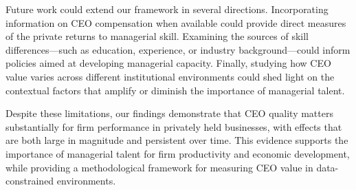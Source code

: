 \documentclass[11pt,a4paper]{article}
\begin{document}
Future work could extend our framework in several directions. Incorporating information on CEO compensation when available could provide direct measures of the private returns to managerial skill. Examining the sources of skill differences—such as education, experience, or industry background—could inform policies aimed at developing managerial capacity. Finally, studying how CEO value varies across different institutional environments could shed light on the contextual factors that amplify or diminish the importance of managerial talent.

Despite these limitations, our findings demonstrate that CEO quality matters substantially for firm performance in privately held businesses, with effects that are both large in magnitude and persistent over time. This evidence supports the importance of managerial talent for firm productivity and economic development, while providing a methodological framework for measuring CEO value in data-constrained environments.
\end{document}
